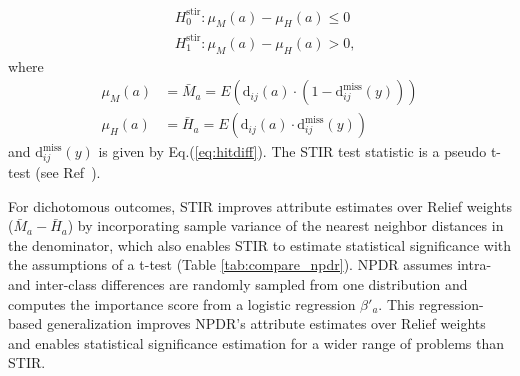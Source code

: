 \documentclass{bioinfo}
\begin{document}

\begin{equation}
\begin{aligned}
    & H^{\text{stir}}_0: \mu_M(a) - \mu_H(a) \le 0 \\
    & H^{\text{stir}}_1: \mu_M(a) - \mu_H(a) > 0,
\end{aligned}
\end{equation}  
where
\begin{equation}
\begin{aligned}
    \mu_M(a) & = \bar{M}_a = E \left( \text{d}_{ij}(a) \cdot \left( 1-\text{d}^{\text{miss}}_{ij}(y) \right) \right) \\
    \mu_H(a) & = \bar{H}_a = E \left( \text{d}_{ij}(a) \cdot        \text{d}^{\text{miss}}_{ij}(y)           \right)
\end{aligned}
\end{equation}  
and $\text{d}^{\text{miss}}_{ij}(y)$ is given by Eq.(\ref{eq:hitdiff}). The STIR test statistic is a pseudo t-test (see Ref~\cite{stir}).

For dichotomous outcomes, STIR improves attribute estimates over Relief weights ($\bar{M}_a - \bar{H}_a$) by incorporating sample variance of the nearest neighbor distances in the denominator, which also enables STIR to estimate statistical significance with the assumptions of a t-test (Table \ref{tab:compare_npdr}).
NPDR assumes intra- and inter-class differences are randomly sampled from one distribution and computes the importance score from a logistic regression $\beta'_a$.
This regression-based generalization improves NPDR's attribute estimates over Relief weights and enables statistical significance estimation for a wider range of problems than STIR.
\end{document}
